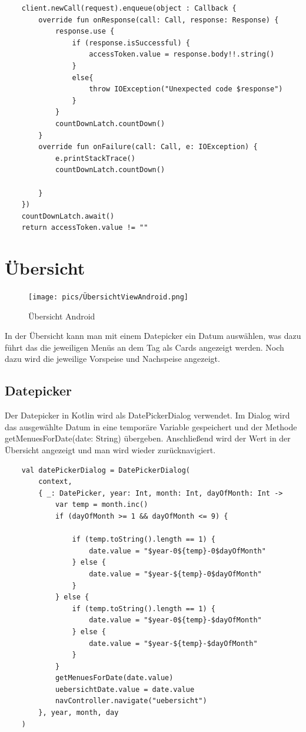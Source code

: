 \begin{lstlisting}
    client.newCall(request).enqueue(object : Callback {
        override fun onResponse(call: Call, response: Response) {
            response.use {
                if (response.isSuccessful) {
                    accessToken.value = response.body!!.string()
                }
                else{
                    throw IOException("Unexpected code $response")
                }
            }
            countDownLatch.countDown()
        }
        override fun onFailure(call: Call, e: IOException) {
            e.printStackTrace()
            countDownLatch.countDown()

        }
    })
    countDownLatch.await()
    return accessToken.value != ""
\end{lstlisting}


\pagebreak
\section{Übersicht}
\begin{figure}[htp]
    \centering
    \author{Bozidar Spasenovic}
    \texttt{[image: pics/ÜbersichtViewAndroid.png]}
    \caption{Übersicht Android}
    \label{fig:impl:ÜbersichtViewAndroid}
\end{figure}

In der Übersicht kann man mit einem Datepicker ein Datum auswählen, was dazu führt das die jeweiligen Menüs an dem Tag 
als Cards angezeigt werden. Noch dazu wird die jeweilige Vorspeise und Nachspeise angezeigt.

\subsection{Datepicker}
Der Datepicker in Kotlin wird als DatePickerDialog verwendet. Im Dialog wird das ausgewählte Datum in eine temporäre Variable gespeichert
und der Methode getMenuesForDate(date: String) übergeben. Anschließend wird der Wert in der Übersicht angezeigt und man wird wieder zurücknavigiert.

\begin{lstlisting}
    val datePickerDialog = DatePickerDialog(
        context,
        { _: DatePicker, year: Int, month: Int, dayOfMonth: Int ->
            var temp = month.inc()
            if (dayOfMonth >= 1 && dayOfMonth <= 9) {

                if (temp.toString().length == 1) {
                    date.value = "$year-0${temp}-0$dayOfMonth"
                } else {
                    date.value = "$year-${temp}-0$dayOfMonth"
                }
            } else {
                if (temp.toString().length == 1) {
                    date.value = "$year-0${temp}-$dayOfMonth"
                } else {
                    date.value = "$year-${temp}-$dayOfMonth"
                }
            }
            getMenuesForDate(date.value)
            uebersichtDate.value = date.value
            navController.navigate("uebersicht")
        }, year, month, day
    )
\end{lstlisting}


